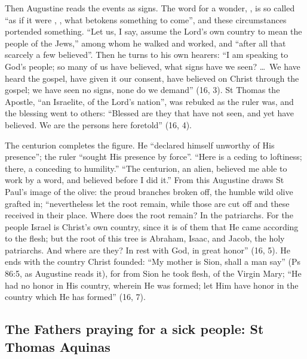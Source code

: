 Then Augustine reads the events as signs. The word for a wonder,
, is so called ``as if it were , , what betokens something to come'', and these circumstances
portended something. ``Let us, I say, assume the Lord's own country to mean the
people of the Jews,'' among whom he walked and worked, and ``after all that
scarcely a few believed''. Then he turns to his own hearers: ``I am speaking to
God's people; so many of us have believed, what signs have we seen? \dots\ We
have heard the gospel, have given it our consent, have believed on Christ through the
gospel; we have seen no signs, none do we demand'' (16, 3). St Thomas the
Apostle, ``an Israelite, of the Lord's nation'', was rebuked as the ruler was,
and the blessing went to others: ``Blessed are they that have not seen, and yet
have believed. We are the persons here foretold'' (16, 4).

The centurion completes the figure. He ``declared himself unworthy of His
presence''; the ruler ``sought His presence by force''. ``Here is a ceding to
loftiness; there, a conceding to humility.'' ``The centurion, an alien, believed
me able to work by a word, and believed before I did it.'' From this Augustine
draws St Paul's image of the olive: the proud branches broken off, the humble
wild olive grafted in; ``nevertheless let the root remain, while those are cut
off and these received in their place. Where does the root remain? In the
patriarchs. For the people Israel is Christ's own country, since it is of them
that He came according to the flesh; but the root of this tree is Abraham,
Isaac, and Jacob, the holy patriarchs. And where are they? In rest with God, in
great honor'' (16, 5). He ends with the country Christ founded: ``My mother is
Sion, shall a man say'' (Ps 86:5, as Augustine reads it), for from Sion he took flesh, of the Virgin
Mary; ``He had no honor in His country, wherein He was formed; let Him have
honor in the country which He has formed'' (16, 7).

\subsection{The Fathers praying for a sick people: St Thomas Aquinas}


